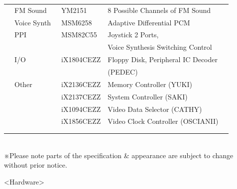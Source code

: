 \documentclass[twoside,a4paper,12pt]{article}
\begin{document}
\begin{tabular}{|p{13mm}|p{25mm}|p{22mm}|p{73mm}|p{30mm}|}
& FM Sound & \ YM2151 & 8 Possible Channels of FM Sound &\\
& Voice Synth & \ MSM6258 & Adaptive Differential PCM &\\
& PPI & \ MSM82C55 & Joystick 2 Ports, &\\
& & & Voice Synthesis Switching Control &\\
& I/O & \ iX1804CEZZ & Floppy Disk, Peripheral IC Decoder &\\
& & & (PEDEC) &\\
& Other & \ iX2136CEZZ & Memory Controller (YUKI) &\\
& & \ iX2137CEZZ & System Controller (SAKI) &\\
& & \ iX1094CEZZ & Video Data Selector (CATHY) &\\
& & \ iX1856CEZZ & Video Clock Controller (OSCIANII) &\\
& & & &\\
& & & &\\
\hline
\end{tabular}\\

※Please note parts of the specification \& appearance are subject to change without prior notice.

\newpage

<Hardware>
\end{document}
